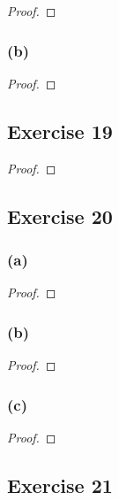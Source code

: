 \documentclass[14pt]{extarticle}
\begin{document}
\begin{proof}

\end{proof}

\subsubsection{(b)}

\begin{proof}

\end{proof}

\subsection{Exercise 19}

\begin{proof}

\end{proof}

\subsection{Exercise 20}

\subsubsection{(a)}

\begin{proof}

\end{proof}

\subsubsection{(b)}

\begin{proof}

\end{proof}

\subsubsection{(c)}

\begin{proof}

\end{proof}

\subsection{Exercise 21}
\end{document}
